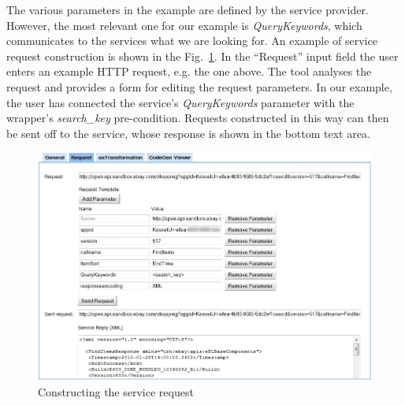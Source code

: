 


The various parameters in the example are defined by the service provider. However, the most relevant one for our example is \emph{QueryKeywords}, which communicates to the services what we are looking for. 
An example of service request construction is shown in the Fig.~\ref{fig:construct_service_request}. In the ``Request'' input field the user enters an example HTTP request, e.g. the one above. The tool analyses the request and provides a form for editing the request parameters. In our example, the user has connected the service's \textit{QueryKeywords} parameter with the wrapper's \textit{search\_key} pre-condition. Requests constructed in this way can then be sent off to the service, whose response is shown in the bottom text area.

\begin{figure}
  \begin{center}
    \includegraphics[width=\linewidth]{images/ServiceWrapperToolGVSWithRequestExample.png}
    \caption{Constructing the service request}
    \label{fig:construct_service_request}
  \end{center}
\end{figure}

